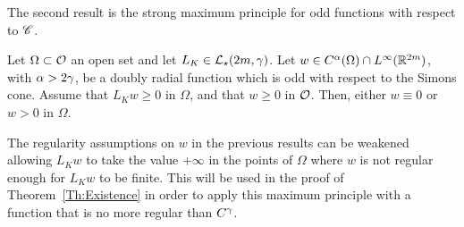 The second result is the strong maximum principle for odd functions with respect to $\mathscr{C}$.

\begin{proposition}
	\label{Prop:StrongMaximumPrincipleForOddFunctions} Let $\Omega \subset \mathcal{O}$ an open set and let $L_K  \in \mathcal{L}_\star (2m,  \gamma)$.  Let $w\in C^{\alpha}(\Omega)\cap L^\infty(\mathbb{R}^{2m})$, with $\alpha > 2\gamma$, be a doubly radial function which is odd with respect to the Simons cone. Assume that $L_K w \geq 0$ in $\Omega$, and that $w\geq 0$ in $\mathcal{O}$. Then, either $w\equiv 0$ or $w > 0$ in $\Omega$.
\end{proposition}

\begin{remark}
	\label{Remark:MaxPrincipleSingularity}
	The regularity assumptions on $w$ in the previous results can be weakened allowing $L_K w$ to take the value $+\infty$ in the points of $\Omega$ where $w$ is not regular enough for $L_K w$ to be finite. This will be used in the proof of Theorem~\ref{Th:Existence} in order to apply this maximum principle with a function that is no more regular than $C^\gamma$.
\end{remark}

